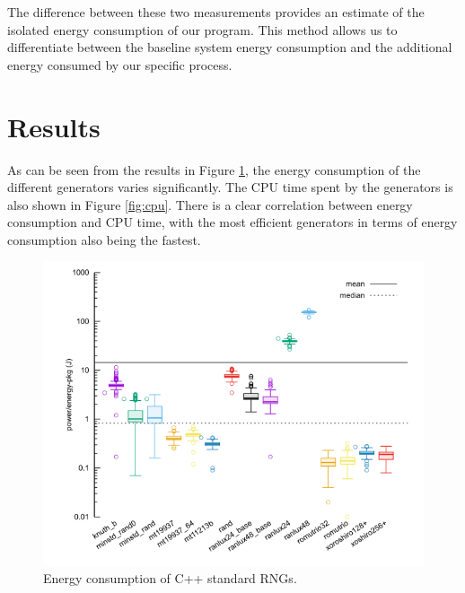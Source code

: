\documentclass[sigconf]{acmart}
\begin{document}
The difference between these two measurements provides an estimate of the isolated energy consumption of our program. This method allows us to differentiate between the baseline system energy consumption and the additional energy consumed by our specific process.

\section{Results}
\label{sec:results}

As can be seen from the results in Figure \ref{fig:pkg}, the energy consumption of the different generators varies significantly. The CPU time spent by the generators is also shown in Figure \ref{fig:cpu}. There is a clear correlation between energy consumption and CPU time, with the most efficient generators in terms of energy consumption also being the fastest.

\begin{figure}
\centering
\includegraphics[width=\columnwidth]{pkg.png}
\caption{Energy consumption of C++ standard RNGs.}
\label{fig:pkg}
\end{figure}
\end{document}
